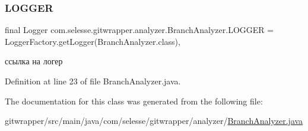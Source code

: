 \mbox{\label{classcom_1_1selesse_1_1gitwrapper_1_1analyzer_1_1_branch_analyzer_acd19adc9de1c16cf04f119fb913291cf}} 
\subsubsection{\texorpdfstring{L\+O\+G\+G\+ER}{LOGGER}}
{\footnotesize\ttfamily final Logger com.\+selesse.\+gitwrapper.\+analyzer.\+Branch\+Analyzer.\+L\+O\+G\+G\+ER = Logger\+Factory.\+get\+Logger(Branch\+Analyzer.\+class)\hspace{0.3cm}{\ttfamily [static]}, {\ttfamily [private]}}



ссылка на логер 



Definition at line 23 of file Branch\+Analyzer.\+java.



The documentation for this class was generated from the following file\+:\begin{DoxyCompactItemize}
\item 
gitwrapper/src/main/java/com/selesse/gitwrapper/analyzer/\hyperlink{_branch_analyzer_8java}{Branch\+Analyzer.\+java}\end{DoxyCompactItemize}
